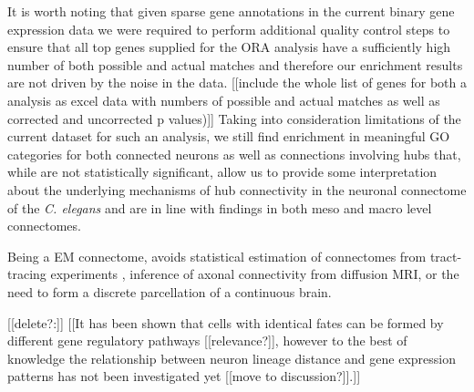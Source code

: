 \documentclass[10pt,letterpaper]{article}
\begin{document}
It is worth noting that given sparse gene annotations in the current binary gene expression data we were required to perform additional quality control steps to ensure that all top genes supplied for the ORA analysis have a sufficiently high number of both possible and actual matches and therefore our enrichment results are not driven by the noise in the data. [[include the whole list of genes for both a analysis as excel data with numbers of possible and actual matches as well as corrected and uncorrected p values)]]
Taking into consideration limitations of the current dataset for such an analysis, we still find enrichment in meaningful GO categories for both connected neurons as well as connections involving hubs that, while are not statistically significant, allow us to provide some interpretation about the underlying mechanisms of hub connectivity in the neuronal connectome of the \textit{C. elegans} and are in line with findings in both meso and macro level connectomes.


Being a EM connectome, avoids statistical estimation of connectomes from tract-tracing experiments \cite{Ypma:2016em}, inference of axonal connectivity from diffusion MRI, or the need to form a discrete parcellation of a continuous brain.

[[delete?:]]
[[It has been shown that cells with identical fates can be formed by different gene regulatory pathways \cite{Liu2009} [[relevance?]], however to the best of knowledge the relationship between neuron lineage distance and gene expression patterns has not been investigated yet [[move to discussion?]].]]
\end{document}
